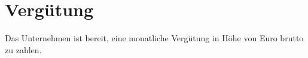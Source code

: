 \section{Vergütung}

Das Unternehmen ist bereit, eine monatliche Vergütung in Höhe von Euro \spaceLineSmall{} brutto zu zahlen.
